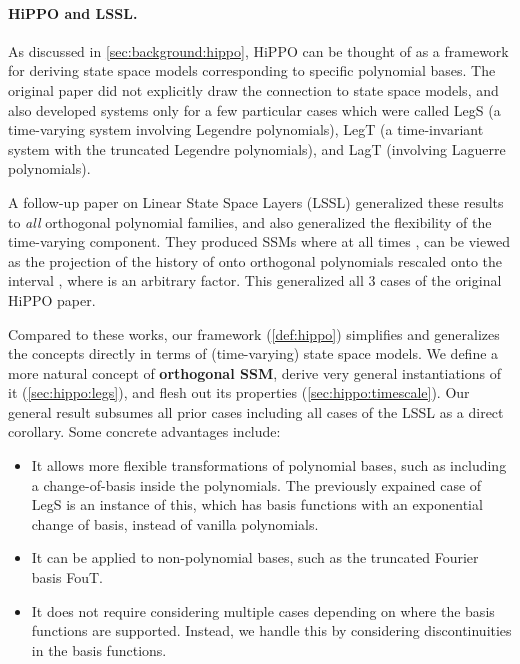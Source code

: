 \documentclass{article}
\begin{document}
\paragraph{HiPPO and LSSL.}
As discussed in \cref{sec:background:hippo}, HiPPO can be thought of as a framework for deriving state space models corresponding to specific polynomial bases.
The original paper did not explicitly draw the connection to state space models, and also developed systems only for a few particular cases which were called LegS (a time-varying system involving Legendre polynomials), LegT (a time-invariant system with the truncated Legendre polynomials), and LagT (involving Laguerre polynomials).

A follow-up paper on Linear State Space Layers (LSSL) generalized these results to \emph{all} orthogonal polynomial families, and also generalized the flexibility of the time-varying component.
They produced SSMs  where at all times ,  can be viewed as the projection of the history of  onto orthogonal polynomials  rescaled onto the interval , where  is an arbitrary factor.
This generalized all 3 cases of the original HiPPO paper.

Compared to these works, our framework (\cref{def:hippo}) simplifies and generalizes the concepts directly in terms of (time-varying) state space models.
We define a more natural concept of \textbf{orthogonal SSM}, derive very general instantiations of it (\cref{sec:hippo:legs}), and flesh out its properties (\cref{sec:hippo:timescale}).
Our general result subsumes all prior cases including all cases of the LSSL as a direct corollary.
Some concrete advantages include:
\begin{itemize}\item It allows more flexible transformations of polynomial bases, such as including a change-of-basis inside the polynomials. The previously expained case of LegS is an instance of this, which has basis functions  with an exponential change of basis, instead of vanilla polynomials.
  \item It can be applied to non-polynomial bases, such as the truncated Fourier basis FouT.
  \item It does not require considering multiple cases depending on where the basis functions are supported. Instead, we handle this by considering discontinuities in the basis functions.
\end{itemize}
\end{document}
